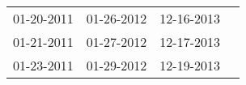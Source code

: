 \begin{supertabular}{llll}
 01-20-2011 &  01-26-2012 &  12-16-2013 \\
 01-21-2011 &  01-27-2012 &  12-17-2013 \\
 01-23-2011 &  01-29-2012 &  12-19-2013 \\
\end{supertabular}
